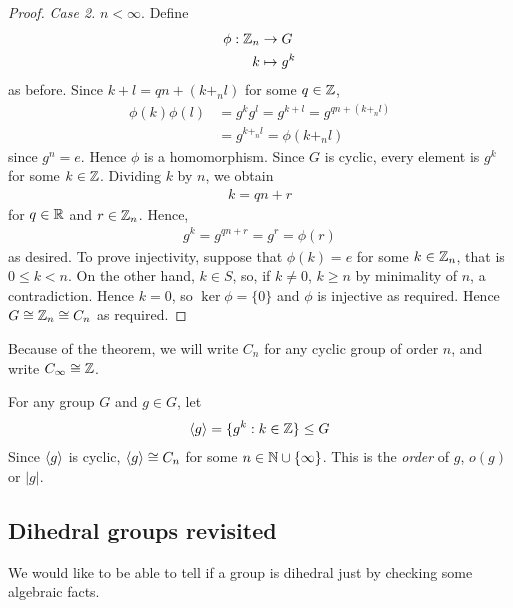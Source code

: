 \documentclass{../template/note}
\begin{document}
\begin{proof}
        \emph{Case 2.} \(n < \infty\). Define
        \begin{align*}
            \phi: \mathbb Z_n &\to G \\
            k &\mapsto g^k
        \end{align*}
        as before. Since \(k+l = qn + (k +_n l)\) for some \(q \in \mathbb Z\),
        \begin{align*}
            \phi(k)\phi(l) &= g^kg^l = g^{k+l} = g^{qn+(k+_nl)} \\
            &= g^{k+_nl} = \phi(k +_n l)
        \end{align*}
        since \(g^n = e\). Hence \(\phi\) is a homomorphism. Since \(G\) is cyclic, every element is \(g^k\) for some \(k \in \mathbb Z\). Dividing \(k\) by \(n\), we obtain
        \begin{align*}
            k = qn + r
        \end{align*}
        for \(q \in \mathbb R\) and \(r \in \mathbb Z_n\). Hence,
        \begin{align*}
            g^k = g^{qn+r} = g^r = \phi(r)
        \end{align*}
        as desired. To prove injectivity, suppose that \(\phi(k) = e\) for some \(k \in \mathbb Z_n\), that is \(0 \leq k < n\). On the other hand, \(k \in S\), so, if \(k \neq 0\), \(k \geq n\) by minimality of \(n\), a contradiction. Hence \(k=0\), so \(\ker \phi = \{0\}\) and \(\phi\) is injective as required. Hence \(G \cong \mathbb Z_n \cong C_n\) as required.
    \end{proof}
    
    Because of the theorem, we will write \(C_n\) for any cyclic group of order \(n\), and write \(C_\infty \cong \mathbb Z\).

    \begin{definition}
        For any group \(G\) and \(g \in G\), let
        \begin{align*}
            \left \langle g \right \rangle = \{g^k : k \in \mathbb Z\} \leq G
        \end{align*}
        Since \(\left \langle g \right \rangle\) is cyclic, \(\left \langle g \right \rangle \cong C_n\) for some \(n \in \mathbb N \cup \{\infty\}\). This is the \emph{order} of \(g\), \(o(g)\) or \(|g|\).        
    \end{definition}
    
    \subsection{Dihedral groups revisited}

    We would like to be able to tell if a group is dihedral just by checking some algebraic facts.
\end{document}
